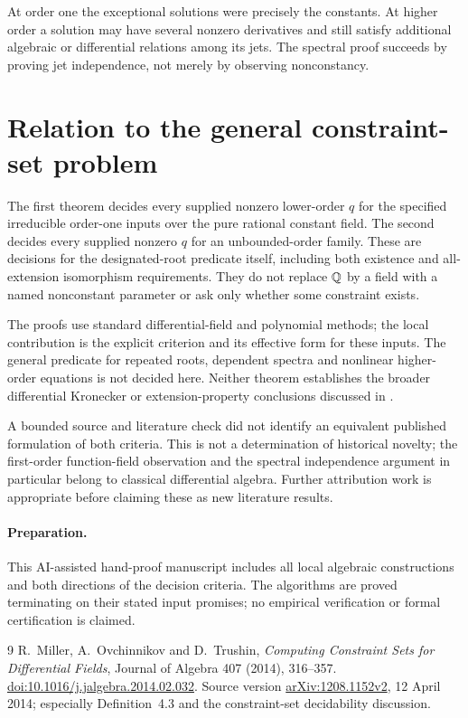 \documentclass[11pt]{article}
\begin{document}
At order one the exceptional solutions were precisely the
constants. At higher order a solution may have several nonzero
derivatives and still satisfy additional algebraic or differential
relations among its jets. The spectral proof succeeds by proving
jet independence, not merely by observing nonconstancy.

\section{Relation to the general constraint-set problem}

The first theorem decides every supplied nonzero lower-order $q$
for the specified irreducible order-one inputs over the pure rational
constant field. The second decides every supplied nonzero $q$ for
an unbounded-order family. These are decisions for the designated-root
predicate itself, including both existence and all-extension
isomorphism requirements. They do not replace $\mathbb Q$ by a field
with a named nonconstant parameter or ask only whether some
constraint exists.

The proofs use standard differential-field and polynomial methods;
the local contribution is the explicit criterion and its effective
form for these inputs. The general predicate for repeated roots,
dependent spectra and nonlinear higher-order equations is not
decided here. Neither theorem establishes the broader differential
Kronecker or extension-property conclusions discussed in \cite{MOT}.

A bounded source and literature check did not identify an equivalent
published formulation of both criteria. This is not a determination
of historical novelty; the first-order function-field observation
and the spectral independence argument in particular belong to
classical differential algebra. Further attribution work is
appropriate before claiming these as new literature results.

\paragraph{Preparation.}
This AI-assisted hand-proof manuscript includes all local algebraic
constructions and both directions of the decision criteria. The
algorithms are proved terminating on their stated input promises;
no empirical verification or formal certification is claimed.

\begin{thebibliography}{9}
 R.~Miller, A.~Ovchinnikov and D.~Trushin,
\emph{Computing Constraint Sets for Differential Fields},
Journal of Algebra 407 (2014), 316--357.
\href{https://doi.org/10.1016/j.jalgebra.2014.02.032}{doi:10.1016/j.jalgebra.2014.02.032}.
Source version \href{https://arxiv.org/abs/1208.1152v2}{arXiv:1208.1152v2},
12 April 2014; especially Definition~4.3 and the constraint-set
decidability discussion.
\end{thebibliography}
\end{document}
